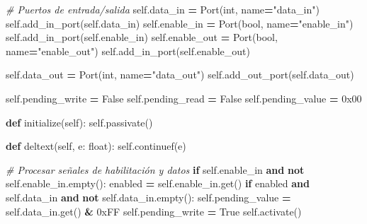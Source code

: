\documentclass[12pt,oneside]{templates/unerthesis}
\newenvironment{Shaded}{\begin{snugshade}}{\end{snugshade}}
\newcommand{\BaseNTok}[1]{\textcolor[rgb]{0.00,0.00,0.81}{#1}}
\newcommand{\BuiltInTok}[1]{#1}
\newcommand{\CommentTok}[1]{\textcolor[rgb]{0.56,0.35,0.01}{\textit{#1}}}
\newcommand{\ControlFlowTok}[1]{\textcolor[rgb]{0.13,0.29,0.53}{\textbf{#1}}}
\newcommand{\KeywordTok}[1]{\textcolor[rgb]{0.13,0.29,0.53}{\textbf{#1}}}
\newcommand{\NormalTok}[1]{#1}
\newcommand{\OperatorTok}[1]{\textcolor[rgb]{0.81,0.36,0.00}{\textbf{#1}}}
\newcommand{\StringTok}[1]{\textcolor[rgb]{0.31,0.60,0.02}{#1}}
\newcommand{\VariableTok}[1]{\textcolor[rgb]{0.00,0.00,0.00}{#1}}
\begin{document}
\begin{Shaded}
\begin{Highlighting}[]
        \CommentTok{\# Puertos de entrada/salida}
        \VariableTok{self}\NormalTok{.data\_in }\OperatorTok{=}\NormalTok{ Port(}\BuiltInTok{int}\NormalTok{, name}\OperatorTok{=}\StringTok{"data\_in"}\NormalTok{)}
        \VariableTok{self}\NormalTok{.add\_in\_port(}\VariableTok{self}\NormalTok{.data\_in)}
        \VariableTok{self}\NormalTok{.enable\_in }\OperatorTok{=}\NormalTok{ Port(}\BuiltInTok{bool}\NormalTok{, name}\OperatorTok{=}\StringTok{"enable\_in"}\NormalTok{)}
        \VariableTok{self}\NormalTok{.add\_in\_port(}\VariableTok{self}\NormalTok{.enable\_in)}
        \VariableTok{self}\NormalTok{.enable\_out }\OperatorTok{=}\NormalTok{ Port(}\BuiltInTok{bool}\NormalTok{, name}\OperatorTok{=}\StringTok{"enable\_out"}\NormalTok{)}
        \VariableTok{self}\NormalTok{.add\_in\_port(}\VariableTok{self}\NormalTok{.enable\_out)}
        
        \VariableTok{self}\NormalTok{.data\_out }\OperatorTok{=}\NormalTok{ Port(}\BuiltInTok{int}\NormalTok{, name}\OperatorTok{=}\StringTok{"data\_out"}\NormalTok{)}
        \VariableTok{self}\NormalTok{.add\_out\_port(}\VariableTok{self}\NormalTok{.data\_out)}
        
        \VariableTok{self}\NormalTok{.pending\_write }\OperatorTok{=} \VariableTok{False}
        \VariableTok{self}\NormalTok{.pending\_read }\OperatorTok{=} \VariableTok{False}
        \VariableTok{self}\NormalTok{.pending\_value }\OperatorTok{=} \BaseNTok{0x00}
    
    \KeywordTok{def}\NormalTok{ initialize(}\VariableTok{self}\NormalTok{):}
        \VariableTok{self}\NormalTok{.passivate()}
    
    \KeywordTok{def}\NormalTok{ deltext(}\VariableTok{self}\NormalTok{, e: }\BuiltInTok{float}\NormalTok{):}
        \VariableTok{self}\NormalTok{.continuef(e)}
        
        \CommentTok{\# Procesar señales de habilitación y datos}
        \ControlFlowTok{if} \VariableTok{self}\NormalTok{.enable\_in }\KeywordTok{and} \KeywordTok{not} \VariableTok{self}\NormalTok{.enable\_in.empty():}
\NormalTok{            enabled }\OperatorTok{=} \VariableTok{self}\NormalTok{.enable\_in.get()}
            \ControlFlowTok{if}\NormalTok{ enabled }\KeywordTok{and} \VariableTok{self}\NormalTok{.data\_in }\KeywordTok{and} \KeywordTok{not} \VariableTok{self}\NormalTok{.data\_in.empty():}
                \VariableTok{self}\NormalTok{.pending\_value }\OperatorTok{=} \VariableTok{self}\NormalTok{.data\_in.get() }\OperatorTok{\&} \BaseNTok{0xFF}
                \VariableTok{self}\NormalTok{.pending\_write }\OperatorTok{=} \VariableTok{True}
                \VariableTok{self}\NormalTok{.activate()}
        

\end{Highlighting}
\end{Shaded}
\end{document}
